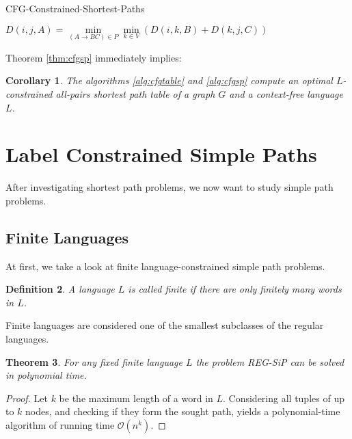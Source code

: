 \documentclass[]{article}
\newtheorem{theorem}{Theorem}[section]
\newtheorem{definition}[theorem]{Definition}
\newtheorem{corollary}[theorem]{Corollary}
\numberwithin{equation}{section}
\begin{document}
\begin{algorithm}[H]
	\caption{CFG-Constrained-Shortest-Paths}
	\label{alg:cfgsp}
	\begin{algorithmic}[1]
		\State{}
				\State $D(i,j,A) = \min\limits_{(A\rightarrow BC)\in P} \min\limits_{k\in V} (D(i,k,B) + D(k,j,C))$
			\EndFor
		\EndFor
		\EndProcedure
	\end{algorithmic}
\end{algorithm}

Theorem \ref{thm:cfgsp} immediately implies:

\begin{corollary}
	The algorithms \ref{alg:cfgtable} and \ref{alg:cfgsp} compute an optimal $L$-constrained all-pairs shortest path table of a graph $G$ and a context-free language $L$.
\end{corollary}

\newpage

\section{Label Constrained Simple Paths}
\label{sec:sip}

After investigating shortest path problems, we now want to study simple path problems.

\subsection{Finite Languages}
\label{sec:sip:finite}

At first, we take a look at finite language-constrained simple path problems.

\begin{definition}
	A language $L$ is called finite if there are only finitely many words in $L$.
\end{definition}

Finite languages are considered one of the smallest subclasses of the regular languages.

\begin{theorem}
	For any fixed finite language $L$ the problem REG-SiP can be solved in polynomial time.
\end{theorem}

\begin{proof}
	Let $k$ be the maximum length of a word in $L$. Considering all tuples of up to $k$ nodes, and checking if they form the sought path, yields a polynomial-time algorithm of running time $\mathcal{O}(n^k)$.
\end{proof}
\end{document}
